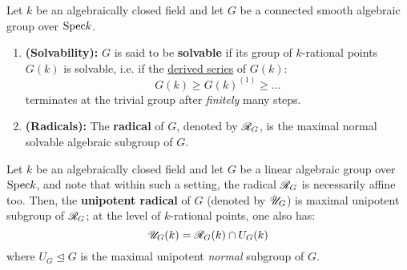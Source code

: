            \begin{definition}[Radicals] \label{def: radicals_of_algebraic_groups}
                Let $k$ be an algebraically closed field and let $G$ be a connected smooth algebraic group over $\mathrm{Spec} k$. 
                    \begin{enumerate}
                        \item \textbf{(Solvability):} $G$ is said to be \textbf{solvable} if its group of $k$-rational points $G(k)$ is solvable, i.e. if the \href{https://ncatlab.org/nlab/show/derived+series}{\underline{derived series}} of $G(k)$:
                            $$G(k) \geq G(k)^{(1)} \geq ... $$
                        terminates at the trivial group after \textit{finitely} many steps. 
                        \item \textbf{(Radicals):} The \textbf{radical} of $G$, denoted by $\mathscr{R}_G$, is the maximal normal solvable algebraic subgroup of $G$. 
                    \end{enumerate}
            \end{definition}
            \begin{remark} \label{remark: unipotent_radicals}
                Let $k$ be an algebraically closed field and let $G$ be a linear algebraic group over $\mathrm{Spec} k$, and note that within such a setting, the radical $\mathscr{R}_G$ is necessarily affine too. Then, the \textbf{unipotent radical} of $G$ (denoted by $\mathscr{U}_G$) is maximal unipotent subgroup of $\mathscr{R}_G$; at the level of $k$-rational points, one also has:
                    $$\mathscr{U}_G(k) = \mathscr{R}_G(k) \cap U_G(k)$$
                where $U_G \trianglelefteq G$ is the maximal unipotent \textit{normal} subgroup of $G$.
            \end{remark}
            
